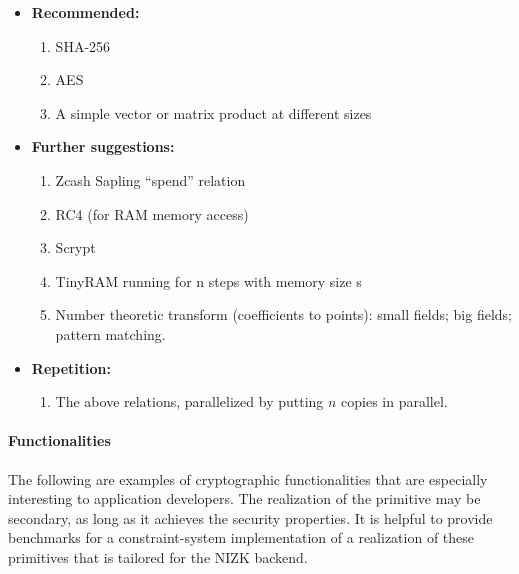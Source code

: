 \begin{itemize}
    \item \textbf{Recommended:}
    \begin{enumerate}
        \item SHA-256
        \item AES
        \item A simple vector or matrix product at different sizes
    \end{enumerate}

    \item \textbf{Further suggestions:}
    \begin{enumerate}
        \item Zcash Sapling ``spend'' relation
        \item RC4 (for RAM memory access)
        \item Scrypt
        \item TinyRAM running for n steps with memory size s 
        \item Number theoretic transform (coefficients to points): small fields; big fields; pattern     matching.
    \end{enumerate}

    \item \textbf{Repetition:}
    \begin{enumerate}
    \item The above relations, parallelized by putting $n$ copies in parallel.
    \end{enumerate}
\end{itemize}


\paragraph{Functionalities}

The following are examples of cryptographic functionalities that are especially interesting to application developers. 
The realization of the primitive may be secondary, as long as it achieves the security properties. 
It is helpful to provide benchmarks for a constraint-system implementation of a realization of these primitives that is tailored for the NIZK backend.

